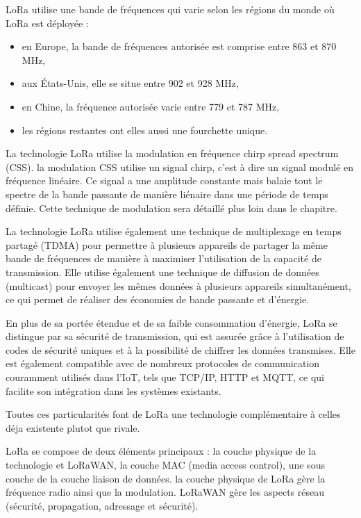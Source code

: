 \documentclass[12pt,a4paper,oneside, titlepage]{report}
\begin{document}
LoRa utilise une bande de fréquences qui varie selon les régions du monde où LoRa est déployée :
\begin{itemize}
\item en Europe, la bande de fréquences autorisée est comprise entre 863 et 870 MHz,
\item aux États-Unis, elle se situe entre 902 et 928 MHz,
\item en Chine, la fréquence autorisée varie entre 779 et 787 MHz,
\item les régions restantes ont elles aussi une fourchette unique.
\end{itemize}

La technologie LoRa utilise la modulation en fréquence chirp spread spectrum (CSS). la modulation CSS utilise un signal chirp, c'est à dire un signal modulé en fréquence linéaire. Ce signal a une amplitude constante mais balaie tout le spectre de la bande passante de manière liénaire dans une période de temps définie. Cette technique de modulation sera détaillé plus loin dans le chapitre.

La technologie LoRa utilise également une technique de multiplexage en temps partagé (TDMA) pour permettre à plusieurs appareils de partager la même bande de fréquences de manière à maximiser l'utilisation de la capacité de transmission. Elle utilise également une technique de diffusion de données (multicast) pour envoyer les mêmes données à plusieurs appareils simultanément, ce qui permet de réaliser des économies de bande passante et d'énergie.

En plus de sa portée étendue et de sa faible consommation d'énergie, LoRa se distingue par sa sécurité de transmission, qui est assurée grâce à l'utilisation de codes de sécurité uniques et à la possibilité de chiffrer les données transmises. Elle est également compatible avec de nombreux protocoles de communication couramment utilisés dans l'IoT, tels que TCP/IP, HTTP et MQTT, ce qui facilite son intégration dans les systèmes existants.

Toutes ces  particularités font de LoRa une technologie complémentaire à celles déja existente plutot que rivale.

LoRa se compose de deux éléments principaux : la couche physique de la technologie et LoRaWAN, la couche MAC (media access control), une sous couche de la couche liaison de données. la couche physique de LoRa gère la fréquence radio ainsi que la modulation. LoRaWAN gère les aspects réseau (sécurité, propagation, adressage et sécurité).
\end{document}
